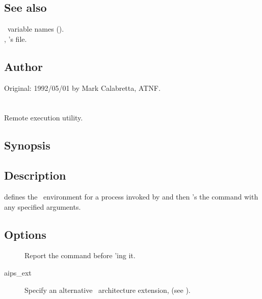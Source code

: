\subsection*{See also}

\aipspp\ variable names ().\\
, 's  file.

\subsection*{Author}

Original: 1992/05/01 by Mark Calabretta, ATNF.


\newpage
\section{}
\label{.rshexec}

Remote execution utility.

\subsection*{Synopsis}

\begin{synopsis}
\end{synopsis}

\subsection*{Description}

 defines the \aipspp\ environment for a process invoked by
 and then 's the command with any specified
arguments.

\subsection*{Options}

\begin{description}
\item[]
   Report the command before 'ing it.

\item[ aips\_ext]
   Specify an alternative \aipspp\ architecture extension, 
   (see ).
\end{description}

